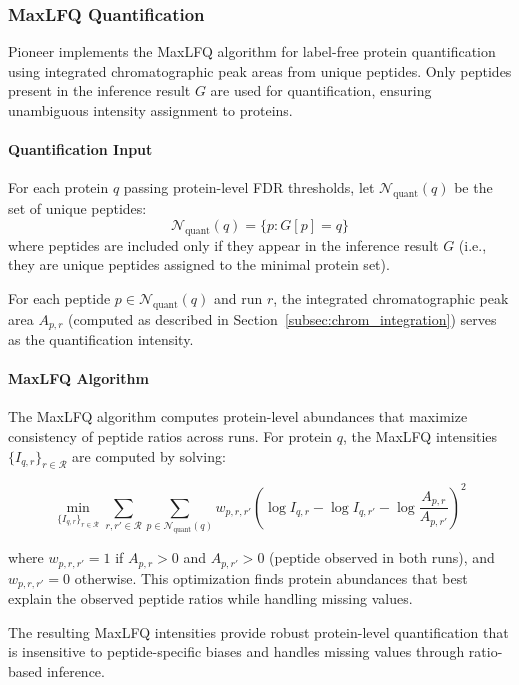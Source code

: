 \documentclass{article}
\begin{document}
\subsubsection{MaxLFQ Quantification}

Pioneer implements the MaxLFQ algorithm \cite{Cox2014} for label-free protein quantification using integrated chromatographic peak areas from unique peptides. Only peptides present in the inference result $G$ are used for quantification, ensuring unambiguous intensity assignment to proteins.

\paragraph{Quantification Input} For each protein $q$ passing protein-level FDR thresholds, let $\mathcal{N}_{\text{quant}}(q)$ be the set of unique peptides:
\begin{equation}
\mathcal{N}_{\text{quant}}(q) = \{p : G[p] = q\}
\end{equation}
where peptides are included only if they appear in the inference result $G$ (i.e., they are unique peptides assigned to the minimal protein set).

For each peptide $p \in \mathcal{N}_{\text{quant}}(q)$ and run $r$, the integrated chromatographic peak area $A_{p,r}$ (computed as described in Section~\ref{subsec:chrom_integration}) serves as the quantification intensity.

\paragraph{MaxLFQ Algorithm} The MaxLFQ algorithm computes protein-level abundances that maximize consistency of peptide ratios across runs. For protein $q$, the MaxLFQ intensities $\{I_{q,r}\}_{r \in \mathcal{R}}$ are computed by solving:

\begin{equation}
\min_{\{I_{q,r}\}_{r \in \mathcal{R}}} \sum_{r,r' \in \mathcal{R}} \sum_{p \in \mathcal{N}_{\text{quant}}(q)} w_{p,r,r'} \left( \log I_{q,r} - \log I_{q,r'} - \log \frac{A_{p,r}}{A_{p,r'}} \right)^2
\end{equation}

where $w_{p,r,r'} = 1$ if $A_{p,r} > 0$ and $A_{p,r'} > 0$ (peptide observed in both runs), and $w_{p,r,r'} = 0$ otherwise. This optimization finds protein abundances that best explain the observed peptide ratios while handling missing values.

The resulting MaxLFQ intensities provide robust protein-level quantification that is insensitive to peptide-specific biases and handles missing values through ratio-based inference.
\end{document}
